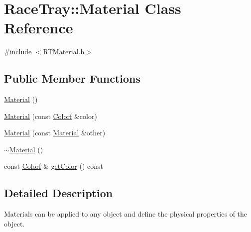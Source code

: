 \hypertarget{class_race_tray_1_1_material}{\section{Race\-Tray\-:\-:Material Class Reference}
\label{class_race_tray_1_1_material}
}


{\ttfamily \#include $<$R\-T\-Material.\-h$>$}

\subsection*{Public Member Functions}
\begin{DoxyCompactItemize}
\item 
\hyperlink{class_race_tray_1_1_material_abee48ff190c189a5e221d2a3db290664}{Material} ()
\item 
\hyperlink{class_race_tray_1_1_material_aa1770e1324eba11c789249a37f75a935}{Material} (const \hyperlink{group___math_gaceb269408b1acca232f701aa53d02857}{Colorf} \&color)
\item 
\hyperlink{class_race_tray_1_1_material_ab905c27cc8825676d6d8ab1c4ab0ee1c}{Material} (const \hyperlink{class_race_tray_1_1_material}{Material} \&other)
\item 
\hyperlink{class_race_tray_1_1_material_aaff68db570405ce13950138014f562c0}{$\sim$\-Material} ()
\item 
const \hyperlink{group___math_gaceb269408b1acca232f701aa53d02857}{Colorf} \& \hyperlink{class_race_tray_1_1_material_aab2a2bd59b1464a09d638b31daf636ae}{get\-Color} () const 
\end{DoxyCompactItemize}


\subsection{Detailed Description}
Materials can be applied to any object and define the physical properties of the object. 

